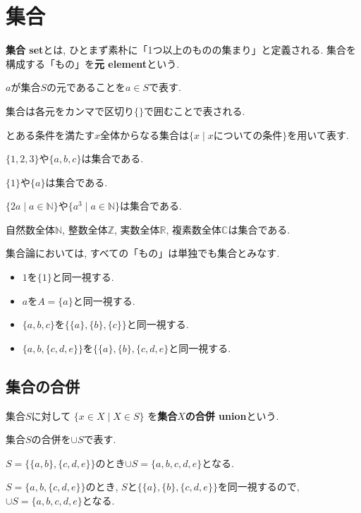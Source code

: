 \section{集合}
{\bf 集合 set}とは, ひとまず素朴に「1つ以上のものの集まり」と定義される. 集合を構成する「もの」を{\bf 元 element}という.
\begin{Notation}
$a$が集合$S$の元であることを$a\in S$で表す.
\end{Notation}
\begin{Notation}
集合は各元をカンマで区切り$\{\}$で囲むことで表される. 
\end{Notation}
\begin{Notation}
とある条件を満たす$x$全体からなる集合は$\{x\mid x\text{についての条件}\}$を用いて表す.
\end{Notation}
\begin{example}$\{1,2,3\}$や$\{a,b,c\}$は集合である. 
\end{example}
\begin{example}$\{1\}$や$\{a\}$は集合である. 
\end{example}
\begin{example}
$\{2a\mid a\in\mathbb{N}\}$や$\{a^3\mid a\in\mathbb{N}\}$は集合である.
\end{example}

\begin{example}
自然数全体$\mathbb{N}$, 整数全体$\mathbb{Z}$, 実数全体$\mathbb{R}$, 複素数全体$\mathbb{C}$は集合である.
\end{example}
\begin{caution}
集合論においては, すべての「もの」は単独でも集合とみなす. 
\begin{itemize}
\item 
$1$を$\{1\}$と同一視する.
\item 
$a$を$A=\{a\}$と同一視する.
\item
$\{a,b,c\}$を$\{\{a\},\{b\},\{c\}\}$と同一視する.
\item 
$\{a,b,\{c,d,e\}\}$を$\{\{a\},\{b\},\{c,d,e\}$と同一視する.
\end{itemize}
\end{caution}
\subsection{集合の合併}
\begin{Def}
集合$S$に対して
$\{x\in X\mid X\in S\}$
を{\bf 集合$X$の合併 union}という.
\end{Def}
\begin{Notation}
集合$S$の合併を$\cup S$で表す.
\end{Notation}
\begin{example}
$S=\{\{a,b\},\{c,d,e\}\}$のとき$\cup S=\{a,b,c,d,e\}$となる.
\end{example}
\begin{example}
$S=\{a,b,\{c,d,e\}\}$のとき, $S$と$\{\{a\},\{b\},\{c,d,e\}\}$を同一視するので,
$\cup S=\{a,b,c,d,e\}$となる.
\end{example}

